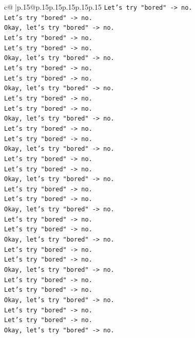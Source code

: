 \documentclass{article}
\begin{document}
{\begin{supertabular}{c@{$\;$}|p{.15\linewidth}@{}p{.15\linewidth}p{.15\linewidth}p{.15\linewidth}p{.15\linewidth}p{.15\linewidth}}
{{{\texttt{Let's try "bored" {-}> no.} \\
\texttt{Let's try "bored" {-}> no.} \\
\texttt{Okay, let's try "bored" {-}> no.} \\
\texttt{Let's try "bored" {-}> no.} \\
\texttt{Let's try "bored" {-}> no.} \\
\texttt{Okay, let's try "bored" {-}> no.} \\
\texttt{Let's try "bored" {-}> no.} \\
\texttt{Let's try "bored" {-}> no.} \\
\texttt{Okay, let's try "bored" {-}> no.} \\
\texttt{Let's try "bored" {-}> no.} \\
\texttt{Let's try "bored" {-}> no.} \\
\texttt{Okay, let's try "bored" {-}> no.} \\
\texttt{Let's try "bored" {-}> no.} \\
\texttt{Let's try "bored" {-}> no.} \\
\texttt{Okay, let's try "bored" {-}> no.} \\
\texttt{Let's try "bored" {-}> no.} \\
\texttt{Let's try "bored" {-}> no.} \\
\texttt{Okay, let's try "bored" {-}> no.} \\
\texttt{Let's try "bored" {-}> no.} \\
\texttt{Let's try "bored" {-}> no.} \\
\texttt{Okay, let's try "bored" {-}> no.} \\
\texttt{Let's try "bored" {-}> no.} \\
\texttt{Let's try "bored" {-}> no.} \\
\texttt{Okay, let's try "bored" {-}> no.} \\
\texttt{Let's try "bored" {-}> no.} \\
\texttt{Let's try "bored" {-}> no.} \\
\texttt{Okay, let's try "bored" {-}> no.} \\
\texttt{Let's try "bored" {-}> no.} \\
\texttt{Let's try "bored" {-}> no.} \\
\texttt{Okay, let's try "bored" {-}> no.} \\
\texttt{Let's try "bored" {-}> no.} \\
\texttt{Let's try "bored" {-}> no.} \\
\texttt{Okay, let's try "bored" {-}> no.} \\
}}}
\end{supertabular}}
\end{document}
